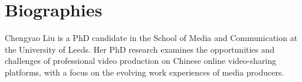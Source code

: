 \documentclass[10pt,a4paper]{article}
\begin{document}
\section*{Biographies}
Chengyao Liu is a PhD candidate in the School of Media and Communication at the University of Leeds. Her PhD research examines the opportunities and challenges of professional video production on Chinese online video-sharing platforms, with a focus on the evolving work experiences of media producers.\par
\end{document}
